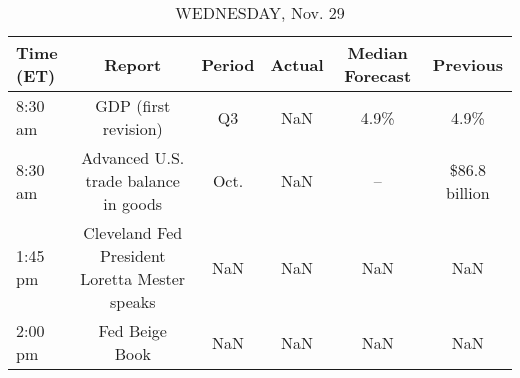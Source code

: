 \documentclass{article}%
\begin{document}
\begin{table}[htbp]%
\caption{WEDNESDAY, Nov. 29}%
\centering%
\begin{adjustbox}{width=1\textwidth}%
\begin{tabular}{lccccc}
\toprule
Time (ET) &                                        Report & Period & Actual & Median Forecast &      Previous \\
\midrule
  8:30 am &                          GDP (first revision) &     Q3 &    NaN &            4.9\% &          4.9\% \\
  8:30 am &          Advanced U.S. trade balance in goods &   Oct. &    NaN &              -- & \$86.8 billion \\
  1:45 pm & Cleveland Fed President Loretta Mester speaks &    NaN &    NaN &             NaN &           NaN \\
  2:00 pm &                                Fed Beige Book &    NaN &    NaN &             NaN &           NaN \\
\bottomrule
\end{tabular}
%
\end{adjustbox}%
\end{table}

%
\end{document}
